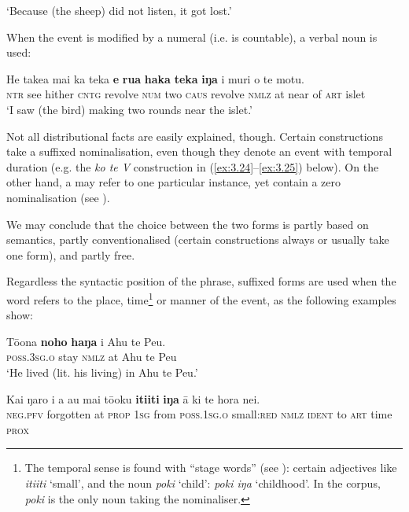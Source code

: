 \glt
‘Because (the sheep) did not listen, it got lost.’ \textstyleExampleref{[R490.005]} 
\z

When the event is modified by a numeral (i.e. is countable), a verbal noun is used:

\ea\label{ex:3.18}
\gll He take{\ꞌ}a mai ka teka \textbf{e} \textbf{rua} \textbf{haka} \textbf{teka} \textbf{iŋa} {\ꞌ}i muri o te motu. \\
\textsc{ntr} see hither \textsc{cntg} revolve \textsc{num} two \textsc{caus} revolve \textsc{nmlz} at near of \textsc{art} islet \\

\glt
‘I saw (the bird) making two rounds near the islet.’ \textstyleExampleref{[R338.014]} 
\z

Not all distributional facts are easily explained, though. Certain constructions take a suffixed nominalisation, even though they denote an event with temporal duration (e.g. the \textit{ko te V} construction in (\ref{ex:3.24}–\ref{ex:3.25}) below). On the other hand, a  may refer to one particular instance, yet contain a zero nominalisation (see ). 

We may conclude that the choice between the two forms is partly based on semantics, partly conventionalised (certain constructions always or usually take one form), and partly free.

Regardless the syntactic position of the phrase, suffixed forms are used when the word refers to the place, time\footnote{\label{fn:107}The temporal sense is found with “stage words” (see \citealt[148]{Broschart1997}): certain adjectives like \textit{{\ꞌ}iti{\ꞌ}iti} ‘small’, and the noun \textit{poki} ‘child’: \textit{poki iŋa} ‘childhood’. In the corpus, \textit{poki} is the only noun taking the nominaliser.}  or manner of the event, as the following examples show:

\ea\label{ex:3.19}
\gll Tō{\ꞌ}ona \textbf{noho} \textbf{haŋa} {\ꞌ}i Ahu te Peu.\\
\textsc{poss.3sg.o} stay \textsc{nmlz} at Ahu te Peu\\

\glt 
‘He lived (lit. his living) in Ahu te Peu.’ \textstyleExampleref{[R233.002]} 
\z

\ea\label{ex:3.20}
\gll Kai ŋaro i a au mai tō{\ꞌ}oku \textbf{{\ꞌ}iti{\ꞌ}iti} \textbf{iŋa} {\ꞌ}ā ki te hora nei.\\
\textsc{neg.pfv} forgotten at \textsc{prop} \textsc{1sg} from \textsc{poss.1sg.o} small:\textsc{red} \textsc{nmlz} \textsc{ident} to \textsc{art} time \textsc{prox}\\


